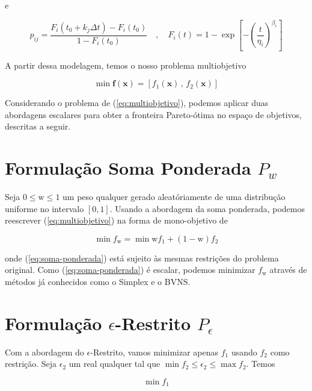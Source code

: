 \documentclass[
	12pt,				%
	oneside,			%
	a4paper,			%
	chapter=TITLE,
	sumario=tradicional,
	english,			%
	brazil				%
]{abntex2}
\begin{document}
\noindent e 

\[ 
p_{ij} = \frac{F_i \left(t_0 + k_j \Delta t \right) - F_i\left(t_0\right) }{1 - F_i\left(t_0\right)}
\quad , \quad 
F_i(t) = 1 - \exp \left[ - \left( \frac{t}{\eta_i} \right)^{\beta_i} \right] 
\]

A partir dessa modelagem, temos o nosso problema multiobjetivo 

\begin{equation} \label{eq:multiobjetivo}
	\min \mathbf{f}\left( \mathbf{x} \right) = \left[ f_1\left( \mathbf{x} \right) \, , \, f_2\left( \mathbf{x} \right) \right]
\end{equation}

Considerando o problema de (\ref{eq:multiobjetivo}), podemos aplicar duas abordagens escalares 
para obter a fronteira Pareto-ótima no espaço de objetivos, descritas a seguir.

\section{Formulação Soma Ponderada $P_{w}$}

Seja $0 \leq \mathrm{w} \leq 1$ um peso qualquer gerado aleatóriamente de uma distribução 
uniforme no intervalo $[0, 1]$. Usando a abordagem da soma ponderada, podemos reescrever 
(\ref{eq:multiobjetivo}) na forma de mono-objetivo de

\begin{equation} \label{eq:soma-ponderada}
	\min f_{\mathrm{w}} = \min \mathrm{w}f_1 + (1-\mathrm{w})f_2
\end{equation}

\noindent onde (\ref{eq:soma-ponderada}) está sujeito às mesmas restrições 
do problema original. Como (\ref{eq:soma-ponderada}) é escalar, podemos 
minimizar $f_{\mathrm{w}}$ através de métodos já conhecidos como o Simplex e o 
BVNS. 



\section{Formulação $\epsilon$-Restrito $P_{\epsilon}$}

Com a abordagem do $\epsilon$-Restrito, vamos minimizar apenas $f_1$ 
usando $f_2$ como restrição. Seja $\epsilon_2$ um real qualquer tal que  $\min f_2 \leq \epsilon_2 \leq \max f_2$.
Temos 

\begin{equation}\label{eq:epsilon}
	\min f_1
\end{equation}
\end{document}
